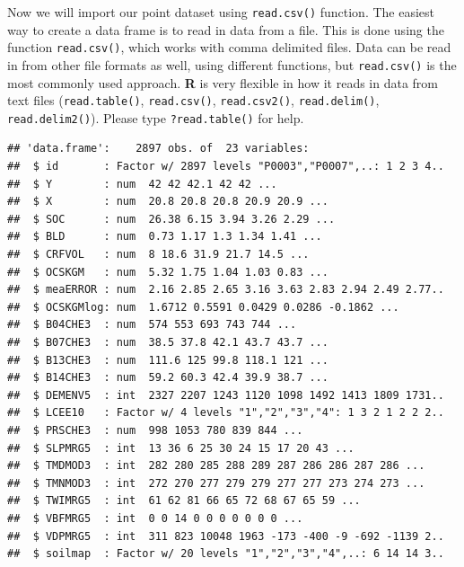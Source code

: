 \documentclass[10pt,b5paper,]{book}
\newenvironment{Shaded}{\begin{snugshade}}{\end{snugshade}}
\newcommand{\CommentTok}[1]{\textcolor[rgb]{0.56,0.35,0.01}{\textit{#1}}}
\newcommand{\KeywordTok}[1]{\textcolor[rgb]{0.13,0.29,0.53}{\textbf{#1}}}
\newcommand{\NormalTok}[1]{#1}
\newcommand{\OperatorTok}[1]{\textcolor[rgb]{0.81,0.36,0.00}{\textbf{#1}}}
\newcommand{\StringTok}[1]{\textcolor[rgb]{0.31,0.60,0.02}{#1}}
\theoremstyle{definition}
\theoremstyle{definition}
\theoremstyle{definition}
\theoremstyle{remark}
\begin{document}
Now we will import our point dataset using \texttt{read.csv()} function.
The easiest way to create a data frame is to read in data from a file.
This is done using the function \texttt{read.csv()}, which works with
comma delimited files. Data can be read in from other file formats as
well, using different functions, but \texttt{read.csv()} is the most
commonly used approach. \textbf{R} is very flexible in how it reads in
data from text files (\texttt{read.table()}, \texttt{read.csv()},
\texttt{read.csv2()}, \texttt{read.delim()}, \texttt{read.delim2()}).
Please type \texttt{?read.table()} for help.

\begin{Shaded}
\end{Shaded}

\begin{verbatim}
## 'data.frame':    2897 obs. of  23 variables:
##  $ id       : Factor w/ 2897 levels "P0003","P0007",..: 1 2 3 4..
##  $ Y        : num  42 42 42.1 42 42 ...
##  $ X        : num  20.8 20.8 20.8 20.9 20.9 ...
##  $ SOC      : num  26.38 6.15 3.94 3.26 2.29 ...
##  $ BLD      : num  0.73 1.17 1.3 1.34 1.41 ...
##  $ CRFVOL   : num  8 18.6 31.9 21.7 14.5 ...
##  $ OCSKGM   : num  5.32 1.75 1.04 1.03 0.83 ...
##  $ meaERROR : num  2.16 2.85 2.65 3.16 3.63 2.83 2.94 2.49 2.77..
##  $ OCSKGMlog: num  1.6712 0.5591 0.0429 0.0286 -0.1862 ...
##  $ B04CHE3  : num  574 553 693 743 744 ...
##  $ B07CHE3  : num  38.5 37.8 42.1 43.7 43.7 ...
##  $ B13CHE3  : num  111.6 125 99.8 118.1 121 ...
##  $ B14CHE3  : num  59.2 60.3 42.4 39.9 38.7 ...
##  $ DEMENV5  : int  2327 2207 1243 1120 1098 1492 1413 1809 1731..
##  $ LCEE10   : Factor w/ 4 levels "1","2","3","4": 1 3 2 1 2 2 2..
##  $ PRSCHE3  : num  998 1053 780 839 844 ...
##  $ SLPMRG5  : int  13 36 6 25 30 24 15 17 20 43 ...
##  $ TMDMOD3  : int  282 280 285 288 289 287 286 286 287 286 ...
##  $ TMNMOD3  : int  272 270 277 279 279 277 277 273 274 273 ...
##  $ TWIMRG5  : int  61 62 81 66 65 72 68 67 65 59 ...
##  $ VBFMRG5  : int  0 0 14 0 0 0 0 0 0 0 ...
##  $ VDPMRG5  : int  311 823 10048 1963 -173 -400 -9 -692 -1139 2..
##  $ soilmap  : Factor w/ 20 levels "1","2","3","4",..: 6 14 14 3..
\end{verbatim}
\end{document}
